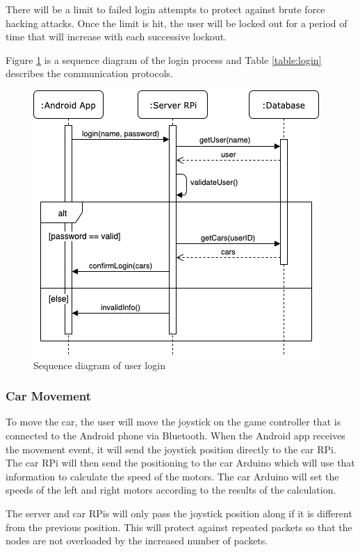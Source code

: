 \documentclass[letterpaper,12pt]{report}
\begin{document}
    There will be a limit to failed login attempts to protect against brute
    force hacking attacks. Once the limit is hit, the user will be locked out
    for a period of time that will increase with each successive lockout.

    Figure \ref{fig:login} is a sequence diagram of the login process and Table
    \ref{table:login} describes the communication protocols.

    \begin{figure}[H]
        \centering
        \includegraphics[width=0.7\linewidth]{diagrams/Design_Login_Sequence.png}
        \caption{Sequence diagram of user login}
        \label{fig:login}
    \end{figure}

    \subsubsection{Car Movement} \label{sssec:movement}

    To move the car, the user will move the joystick on the game controller
    that is connected to the Android phone via Bluetooth. When the Android
    app receives the movement event, it will send the joystick position
    directly to the car RPi. The car RPi will then send the positioning to
    the car Arduino which will use that information to calculate the speed
    of the motors. The car Arduino will set the speeds of the left and right
    motors according to the results of the calculation.

    The server and car RPis will only pass the joystick position along if it is
    different from the previous position. This will protect against repeated
    packets so that the nodes are not overloaded by the increased number of
    packets.
\end{document}
